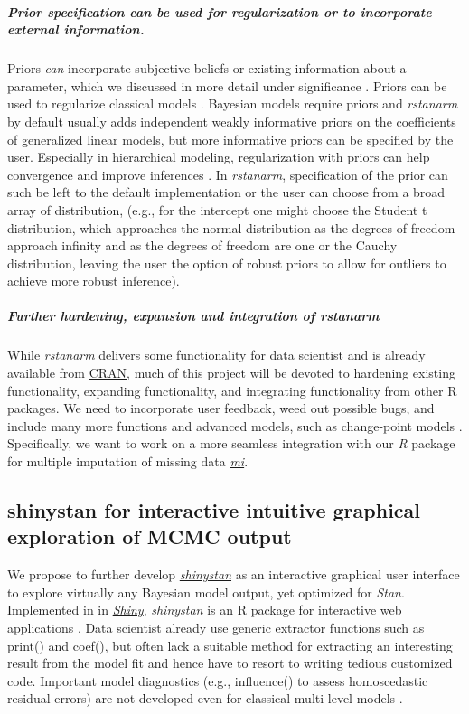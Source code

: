 \documentclass[11pt,notitlepage]{article}
\begin{document}
\subparagraph*{Prior specification can be used for regularization or to incorporate external information.} 
Priors \textit{can} incorporate subjective beliefs or existing information about a parameter,  
which we discussed in more detail under significance \cite{carlin1997bayes}. 
Priors can be used to regularize classical models \cite{gelman2008weakly}. 
Bayesian models require priors and \textit{rstanarm} by default usually
adds independent weakly informative priors on the coefficients of generalized linear models, 
but more informative priors can be specified by the user. Especially in hierarchical modeling, 
regularization with priors can help convergence and improve inferences 
\cite{Gelman-Hill_2014}. In \textit{rstanarm}, specification of the prior 
can such be left to the default implementation or the user can choose from 
a broad array of distribution, (e.g., for the intercept one might choose the 
Student t distribution, which approaches the normal distribution as the 
degrees of freedom approach infinity and as the degrees of freedom are 
one or the Cauchy distribution, leaving the user the option of robust 
priors to allow for outliers to achieve more robust inference). 

\subparagraph*{Further hardening, expansion and integration of \textit{rstanarm}}
While \textit{rstanarm} delivers some functionality for data scientist and is already available from 
\href{https://cran.rstudio.com/web/packages/rstanarm/}{CRAN}, much of this project will be devoted to hardening existing functionality, 
expanding functionality, and integrating functionality from other R packages. We need to incorporate user feedback, weed out 
possible bugs, and include many more functions and advanced models, such as change-point models \cite{Hall2000}. Specifically, 
we want to work on a more seamless integration with our \textit{R} package for multiple imputation of missing data 
\href{https://cran.r-project.org/web/packages/mi/index.html}{\textit{mi}}.

\subsection*{shinystan for interactive intuitive graphical exploration of MCMC output}
We propose to further develop \href{http://andrewgelman.com/2015/03/02/introducing-shinystan/}
{\textit{shinystan}} \cite{GabryISCB2015,shinystan} as an interactive graphical user interface to explore virtually any Bayesian model output, 
yet optimized for \textit{Stan}. Implemented in in \href{http://shiny.rstudio.com/}{\textit{Shiny}}, \textit{shinystan} is an R package for 
interactive web applications \cite{shinystan-software:2015,shinystan}. Data scientist already use generic extractor functions such as print() and coef(), 
but often lack a suitable method for extracting an interesting result from the model fit and hence have to resort to 
writing tedious customized code. Important model diagnostics (e.g., influence() to assess  homoscedastic residual errors) 
are not developed even for classical multi-level models \cite{Galecki2013linear}.
\end{document}
